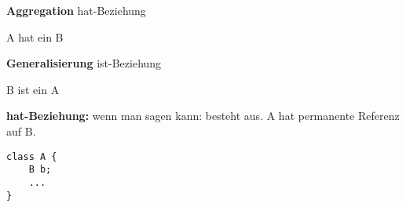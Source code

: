 \documentclass[12pt, oneside]{article}   	%
\begin{document}
\textbf{Aggregation} hat-Beziehung \\ 
\begin{center}
	A hat ein B
\end{center}
\begin{center}
\end{center}

\textbf{Generalisierung} ist-Beziehung \\ 
\begin{center}
	B ist ein A
\end{center}
\begin{center}
\end{center}

\vspace{0.5cm}

\textbf{hat-Beziehung:} wenn man sagen kann:  \glqq besteht aus\grqq. A hat permanente Referenz auf B.

\begin{lstlisting}[frame=single]
class A {
	B b;
	...
}
\end{lstlisting}
\begin{center}
\end{center}

\newpage
\end{document}
